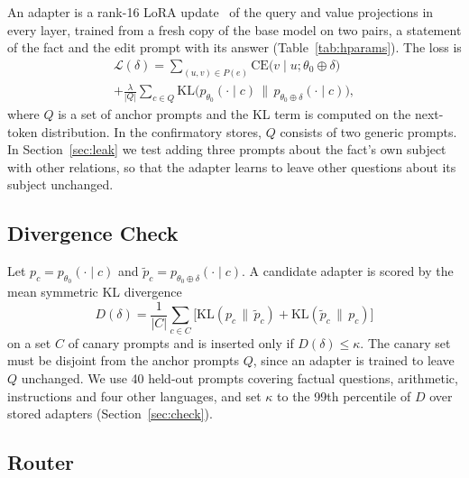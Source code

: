 \documentclass[journal,10pt]{IEEEtran}
\begin{document}
An adapter is a rank-16 LoRA update~\cite{hu2022lora} of the query and value projections
in every layer, trained from a fresh copy of the base model on two pairs, a statement of
the fact and the edit prompt with its answer (Table~\ref{tab:hparams}). The loss is
\begin{multline}
\mathcal{L}(\delta)=\sum_{(u,v)\in P(e)}\mathrm{CE}\big(v\mid u;\theta_0\oplus\delta\big)\\
+\frac{\lambda}{|Q|}\sum_{c\in Q}\mathrm{KL}\big(p_{\theta_0}(\cdot\mid c)\,\big\|\,
p_{\theta_0\oplus\delta}(\cdot\mid c)\big),
\label{eq:loss}
\end{multline}
where $Q$ is a set of anchor prompts and the KL term is computed on the next-token
distribution. In the confirmatory stores, $Q$ consists of two generic prompts. In
Section~\ref{sec:leak} we test adding three prompts about the fact's own subject with
other relations, so that the adapter learns to leave other questions about its subject
unchanged.

\subsection{Divergence Check}
\label{sec:checkmethod}

Let $p_c=p_{\theta_0}(\cdot\mid c)$ and $\tilde p_c=p_{\theta_0\oplus\delta}(\cdot\mid c)$.
A candidate adapter is scored by the mean symmetric KL divergence
\begin{equation}
D(\delta)=\frac{1}{|C|}\sum_{c\in C}\big[\mathrm{KL}(p_c\,\|\,\tilde p_c)
+\mathrm{KL}(\tilde p_c\,\|\,p_c)\big]
\end{equation}
on a set $C$ of canary prompts and is inserted only if $D(\delta)\le\kappa$. The canary
set must be disjoint from the anchor prompts $Q$, since an adapter is trained to leave
$Q$ unchanged. We use 40 held-out prompts covering factual questions, arithmetic,
instructions and four other languages, and set $\kappa$ to the 99th percentile of $D$
over stored adapters (Section~\ref{sec:check}).

\subsection{Router}
\label{sec:router}
\end{document}
